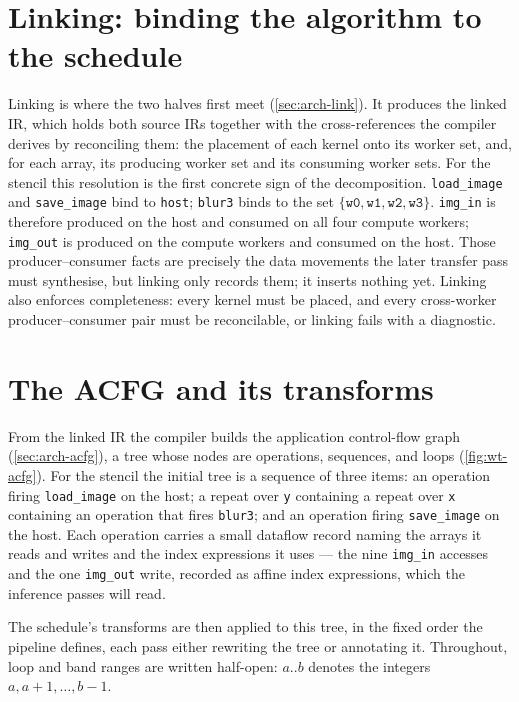 \section{Linking: binding the algorithm to the schedule}\label{sec:wt-link}

Linking is where the two halves first meet (\cref{sec:arch-link}). It produces the
linked IR, which holds both source IRs together with the cross-references the
compiler derives by reconciling them: the placement of each kernel onto its worker
set, and, for each array, its producing worker set and its consuming worker sets.
For the stencil this resolution is the first concrete sign of the decomposition.
\texttt{load\_image} and \texttt{save\_image} bind to \texttt{host}; \texttt{blur3}
binds to the set $\{\texttt{w0},\texttt{w1},\texttt{w2},\texttt{w3}\}$.
\texttt{img\_in} is therefore produced on the host and consumed on all four compute
workers; \texttt{img\_out} is produced on the compute workers and consumed on the
host. Those producer--consumer facts are precisely the data movements the later
transfer pass must synthesise, but linking only records them; it inserts nothing
yet. Linking also enforces completeness: every kernel must be placed, and every
cross-worker producer--consumer pair must be reconcilable, or linking fails with a
diagnostic.

\section{The ACFG and its transforms}\label{sec:wt-acfg}

From the linked IR the compiler builds the application control-flow graph
(\cref{sec:arch-acfg}), a tree whose nodes are operations, sequences, and loops
(\cref{fig:wt-acfg}). For the stencil the initial tree is a sequence of three
items: an operation firing \texttt{load\_image} on the host; a repeat over
\texttt{y} containing a repeat over \texttt{x} containing an operation that fires
\texttt{blur3}; and an operation firing \texttt{save\_image} on the host. Each
operation carries a small dataflow record naming the arrays it reads and writes and
the index expressions it uses --- the nine \texttt{img\_in} accesses and the one
\texttt{img\_out} write, recorded as affine index expressions, which the inference
passes will read.



The schedule's transforms are then applied to this tree, in the fixed order the
pipeline defines, each pass either rewriting the tree or annotating it. Throughout,
loop and band ranges are written half-open: $a..b$ denotes the integers
$a, a{+}1, \dots, b{-}1$.


